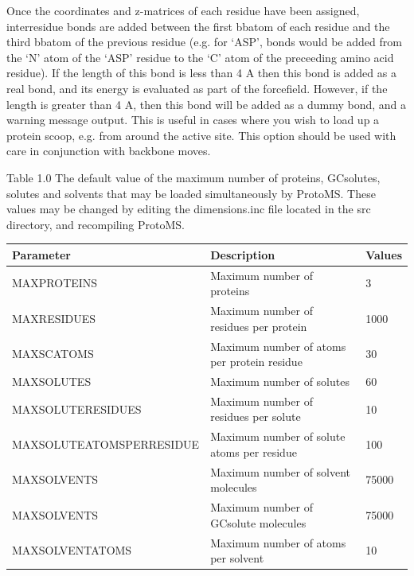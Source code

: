 \documentclass[letterpaper,10pt,english]{sphinxmanual}
\begin{document}
Once the coordinates and z-matrices of each residue have been assigned, interresidue bonds are added between the first bbatom of each residue and the third bbatom of the previous residue (e.g. for ‘ASP’, bonds would be added from the ‘N’ atom of the ‘ASP’ residue to the ‘C’ atom of the preceeding amino acid residue). If the length of this bond is less than 4 A then this bond is added as a real bond, and its energy is evaluated as part of the forcefield. However, if the length is greater than 4 A, then this bond will be added as a dummy bond, and a warning message output. This is useful in cases where you wish to load up a protein scoop, e.g. from around the active site. This option should be used with care in conjunction with backbone moves.


\begin{threeparttable}
\capstart\caption{Table 1.0 The default value of the maximum number of proteins, GCsolutes, solutes and solvents that may be loaded simultaneously by ProtoMS. These values may be changed by editing the dimensions.inc file located in the src directory, and recompiling ProtoMS.}

\begin{tabulary}{\linewidth}{|L|L|L|}
\hline
\textsf{\relax 
Parameter
} & \textsf{\relax 
Description
} & \textsf{\relax 
Values
}\\
\hline
MAXPROTEINS
 & 
Maximum number of proteins
 & 
3
\\

MAXRESIDUES
 & 
Maximum number of residues per protein
 & 
1000
\\

MAXSCATOMS
 & 
Maximum number of atoms per protein residue
 & 
30
\\

MAXSOLUTES
 & 
Maximum number of solutes
 & 
60
\\

MAXSOLUTERESIDUES
 & 
Maximum number of residues per solute
 & 
10
\\

MAXSOLUTEATOMSPERRESIDUE
 & 
Maximum number of solute atoms per residue
 & 
100
\\

MAXSOLVENTS
 & 
Maximum number of solvent molecules
 & 
75000
\\

MAXSOLVENTS
 & 
Maximum number of GCsolute molecules
 & 
75000
\\

MAXSOLVENTATOMS
 & 
Maximum number of atoms per solvent
 & 
10
\\
\hline\end{tabulary}

\end{threeparttable}
\end{document}

